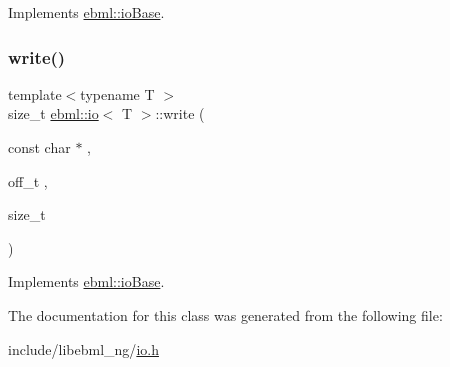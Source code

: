 Implements \mbox{\hyperlink{classebml_1_1ioBase_ad4a000de5db86375be0bf338130f76c9}{ebml\+::io\+Base}}.

\mbox{\label{classebml_1_1io_a5c3f2df6edfbd090b4d0fbc8a6dacccb}} 
\subsubsection{\texorpdfstring{write()}{write()}\hspace{0.1cm}{\footnotesize\ttfamily [2/2]}}
{\footnotesize\ttfamily template$<$typename T $>$ \\
size\+\_\+t \mbox{\hyperlink{classebml_1_1io}{ebml\+::io}}$<$ T $>$\+::write (\begin{DoxyParamCaption}\item[{const char $\ast$}]{,  }\item[{off\+\_\+t}]{,  }\item[{size\+\_\+t}]{ }\end{DoxyParamCaption})\hspace{0.3cm}{\ttfamily [virtual]}}



Implements \mbox{\hyperlink{classebml_1_1ioBase_ad4a000de5db86375be0bf338130f76c9}{ebml\+::io\+Base}}.



The documentation for this class was generated from the following file\+:\begin{DoxyCompactItemize}
\item 
include/libebml\+\_\+ng/\mbox{\hyperlink{io_8h}{io.\+h}}\end{DoxyCompactItemize}
